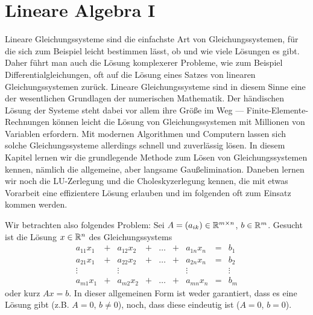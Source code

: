 % 
\chapter{Lineare Algebra \textrm{I}}

Lineare Gleichungssysteme sind die einfachste Art von
Gleichungssystemen, für die sich zum Beispiel leicht bestimmen lässt,
ob und wie viele Lösungen es gibt. Daher führt man auch die Lösung
komplexerer Probleme, wie zum Beispiel Differentialgleichungen, oft
auf die Lösung eines Satzes von linearen Gleichungssystemen
zurück. Lineare Gleichungssysteme sind in diesem Sinne eine der
wesentlichen Grundlagen der numerischen Mathematik. Der händischen
Lösung der Systeme steht dabei vor allem ihre Größe im Weg ---
Finite-Elemente-Rechnungen können leicht die Lösung von
Gleichungssystemen mit Millionen von Variablen erfordern. Mit modernen
Algorithmen und Computern lassen sich solche Gleichungssysteme
allerdings schnell und zuverlässig lösen. In diesem Kapitel lernen wir
die grundlegende Methode zum Lösen von Gleichungssystemen kennen,
nämlich die allgemeine, aber langsame Gaußelimination. Daneben lernen
wir noch die LU-Zerlegung und die Choleskyzerlegung kennen, die mit
etwas Vorarbeit eine effizientere Lösung erlauben und im folgenden oft
zum Einsatz kommen werden.

Wir betrachten also folgendes Problem: Sei $A=(a_{ik})\in\mathbb{R}^{m\times
  n}$, $b\in\mathbb{R}^m$. Gesucht ist die Lösung $x\in\mathbb{R}^n$ des
Gleichungssystems
\begin{equation}
  \label{eq:lgs}
  \begin{matrix}
    a_{11}x_1 &+&  a_{12}x_2 &+& \ldots &+& a_{1n}x_n &=& b_1\\
    a_{21}x_1 &+&  a_{22}x_2 &+& \ldots &+& a_{2n}x_n &=& b_2\\
    \vdots   &&   \vdots   &&         && \vdots  && \vdots\\
    a_{m1}x_1 &+&  a_{m2}x_2 &+& \ldots &+& a_{mn}x_n &=& b_m
  \end{matrix}
\end{equation}
oder kurz $Ax=b$. In dieser allgemeinen Form ist weder garantiert,
dass es eine Lösung gibt (z.B. $A=0$, $b\neq 0$), noch, dass diese
eindeutig ist ($A=0$, $b=0$).

